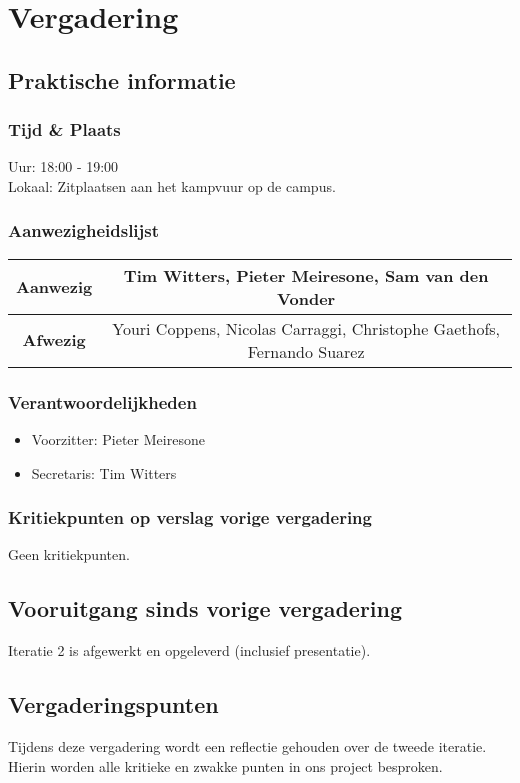 \section{Vergadering \MeetingDate}
\subsection{Praktische informatie}
\subsubsection{Tijd \& Plaats}
Uur: 18:00 - 19:00
\\
Lokaal: Zitplaatsen aan het kampvuur op de campus.
\subsubsection{Aanwezigheidslijst}
\begin{table}[htbp]
	\centering
	\begin{tabular}{c|c}
		\textbf{Aanwezig} & Tim Witters, Pieter Meiresone, Sam van den Vonder \\
		\hline
		\textbf{Afwezig} & Youri Coppens, Nicolas Carraggi, Christophe Gaethofs, Fernando Suarez \\
	\end{tabular}
\end{table}

\subsubsection{Verantwoordelijkheden}
\begin{itemize}
	\item Voorzitter: Pieter Meiresone
	\item Secretaris: Tim Witters
\end{itemize}

\subsubsection{Kritiekpunten op verslag vorige vergadering}
Geen kritiekpunten.

\subsection{Vooruitgang sinds vorige vergadering}
Iteratie 2 is afgewerkt en opgeleverd (inclusief presentatie).

\subsection{Vergaderingspunten}
Tijdens deze vergadering wordt een reflectie gehouden over de tweede iteratie. Hierin worden alle kritieke en zwakke punten in ons project besproken.
